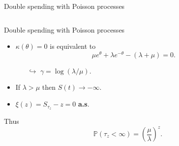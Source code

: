 \documentclass{beamer}
\begin{document}
\begin{frame}{Double spending with Poisson processes}
\begin{columns}
\begin{column}{0.5\textwidth}
\end{column}
\end{columns}
\end{frame}
\begin{frame}{Double spending with Poisson processes}

\begin{itemize}
\item $\kappa(\theta)=0$ is equivalent to
$$
\mu e^{\theta}+\lambda e^{-\theta}-(\lambda+\mu)=0.
$$

\begin{itemize}
\item[$\hookrightarrow$] $\gamma=\log(\lambda/\mu).$
\end{itemize}
\item If $\lambda>\mu$ then $S(t)\rightarrow - \infty$.
\item $\xi(z)=S_{\tau_z}-z=0$ \textbf{a.s}.
\end{itemize}
Thus
$$\mathbb{P}(\tau_z<\infty)=\left(\frac{\mu}{\lambda}\right)^{z}.$$

\end{frame}
\end{document}
